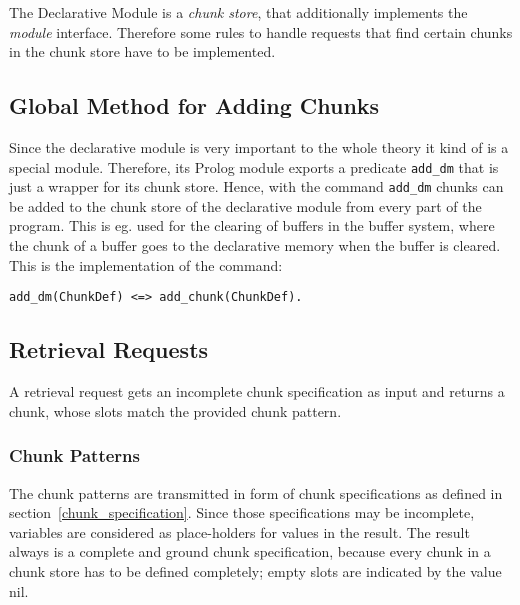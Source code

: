 The Declarative Module is a \emph{chunk store}, that additionally implements the \emph{module} interface. Therefore some rules to handle requests that find certain chunks in the chunk store have to be implemented. 

\subsection{Global Method for Adding Chunks}
\label{global_method_for_adding_chunks}

Since the declarative module is very important to the whole theory it kind of is a special module. Therefore, its Prolog module exports a predicate \verb|add_dm| that is just a wrapper for its chunk store. Hence, with the command \verb|add_dm| chunks can be added to the chunk store of the declarative module from every part of the program. This is eg. used for the clearing of buffers in the buffer system, where the chunk of a buffer goes to the declarative memory when the buffer is cleared. This is the implementation of the command:

\begin{lstlisting}
add_dm(ChunkDef) <=> add_chunk(ChunkDef).
\end{lstlisting}



\subsection{Retrieval Requests}
\label{retrieval_requests}

A retrieval request gets an incomplete chunk specification as input and returns a chunk, whose slots match the provided chunk pattern.

\subsubsection{Chunk Patterns}

The chunk patterns are transmitted in form of chunk specifications as defined in section~\ref{chunk_specification}. Since those specifications may be incomplete, variables are considered as place-holders for values in the result. The result always is a complete and ground chunk specification, because every chunk in a chunk store has to be defined completely; empty slots are indicated by the value nil.

